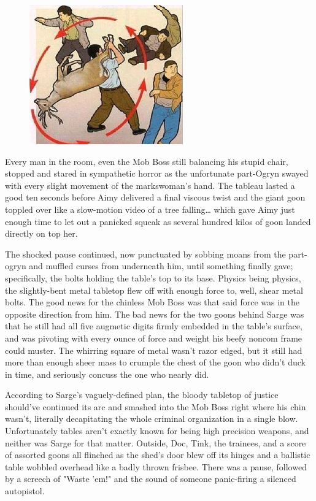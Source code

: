 \begin{figure}
	\begin{center}
		\includegraphics[width=\figwidth]{pics/21/47.png}
	\end{center}
\end{figure}
Every man in the room, even the Mob Boss still balancing his stupid chair, stopped and stared in sympathetic horror as the unfortunate part-Ogryn swayed with every slight movement of the markswoman's hand. 
The tableau lasted a good ten seconds before Aimy delivered a final viscous twist and the giant goon toppled over like a slow-motion video of a tree falling… which gave Aimy just enough time to let out a panicked squeak as several hundred kilos of goon landed directly on top her.

The shocked pause continued, now punctuated by sobbing moans from the part-ogryn and muffled curses from underneath him, until something finally gave; 
specifically, the bolts holding the table's top to its base. 
Physics being physics, the slightly-bent metal tabletop flew off with enough force to, well, shear metal bolts. 
The good news for the chinless Mob Boss was that said force was in the opposite direction from him. 
The bad news for the two goons behind Sarge was that he still had all five augmetic digits firmly embedded in the table's surface, and was pivoting with every ounce of force and weight his beefy noncom frame could muster. 
The whirring square of metal wasn't razor edged, but it still had more than enough sheer mass to crumple the chest of the goon who didn't duck in time, and seriously concuss the one who nearly did. 


According to Sarge's vaguely-defined plan, the bloody tabletop of justice should've continued its arc and smashed into the Mob Boss right where his chin wasn't, literally decapitating the whole criminal organization in a single blow. 
Unfortunately tables aren't exactly known for being high precision weapons, and neither was Sarge for that matter. 
Outside, Doc, Tink, the trainees, and a score of assorted goons all flinched as the shed's door blew off its hinges and a ballistic table wobbled overhead like a badly thrown frisbee. 
There was a pause, followed by a screech of "Waste 'em!" and the sound of someone panic-firing a silenced autopistol.

